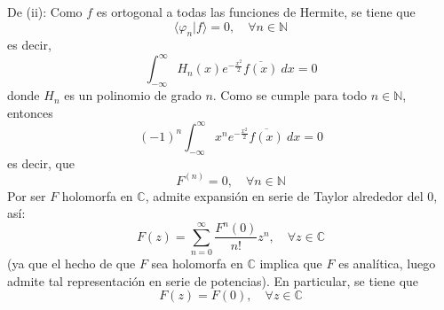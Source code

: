 \documentclass[12pt]{report}
\theoremstyle{largebreak}
\newcommand\pint[2]{\ensuremath{\langle#1| #2\rangle}}
\newcommand\conj[1]{\ensuremath{\overline{#1}}}
\begin{document}
\begin{sol}
        De (ii): Como $f$ es ortogonal a todas las funciones de Hermite, se tiene que
        \begin{equation*}
            \pint{\varphi_n}{f}=0,\quad\forall n\in\mathbb{N}
        \end{equation*}
        es decir,
        \begin{equation*}
            \int_{ -\infty}^{\infty}H_n(x)e^{ -\frac{x^2}{2}}\conj{f(x)}\:dx=0
        \end{equation*}
        donde $H_n$ es un polinomio de grado $n$. Como se cumple para todo $n\in\mathbb{N}$, entonces
        \begin{equation*}
            (-1)^n\int_{ -\infty}^{\infty}x^n e^{ -\frac{x^2}{2}}\conj{f(x)}\:dx=0
        \end{equation*}
        es decir, que
        \begin{equation*}
            F^(n)=0,\quad\forall n\in\mathbb{N}
        \end{equation*}
        Por ser $F$ holomorfa en $\mathbb{C}$, admite expansión en serie de Taylor alrededor del 0, así:
        \begin{equation*}
            F(z)=\sum_{ n=0}^\infty \frac{F^{n}(0)}{n!}z^n,\quad\forall z\in\mathbb{C}
        \end{equation*}
        (ya que el hecho de que $F$ sea holomorfa en $\mathbb{C}$ implica que $F$ es analítica, luego admite tal representación en serie de potencias). En particular, se tiene que
        \begin{equation*}
            F(z)=F(0),\quad\forall z\in\mathbb{C}
        \end{equation*}
    \end{sol}
\end{document}
